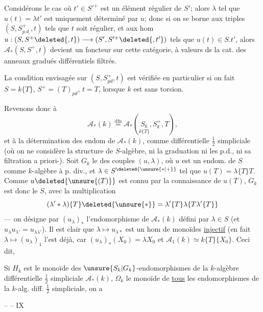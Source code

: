 Considérons le cas où $t'\in S'^+$ est un élément régulier de $S'$; alors $\lambda$ tel que $u(t)=\lambda t'$ est uniquement déterminé par $u$; donc si on se borne aux triples $(S,S^+_{p.d.},t)$ tels que $t$ soit régulier, et aux hom $u:(S,S^+\deleted{,t})\longrightarrow(S',S'^+\deleted{,t'})$ tels que $u(t)\in S.t'$, alors $\mathcal A_*(S,S^+,t)$ devient un foncteur sur cette catégorie, à valeurs ds la cat. des  anneaux gradués   différentiels filtrés.

La condition envisagée sur $(S,S^+_{pd},t)$ est vérifiée en particulier si on fait $S=k\{T\}$, $S^+=(T)_{pd}$, $t=T$, lorsque $k$ est sans torsion.

Revenons donc à
\[
\mathcal A_*(k)\overset{\mathrm{dfn}}=\mathcal A_*(\underset{k\{T\}}{S_k},S_k^+,T),
\]
et à la détermination des endom de $\mathcal A_*(k)$, comme   différentielle $\frac12$ simpliciale (où on ne considère  la structure de $S$-algèbre, ni la graduation ni les p.d., ni sa filtration a priori-). 
Soit $G_k$ le   des couples $(u,\lambda)$, où $u$ est un endom. de $S$ comme $k$-algèbre à p. div., et $\lambda\in S^{\deleted{\unsure{*|+}}}$ tel que $u(T)=\lambda\{T\}T$. Comme $u\deleted{\unsure{(T)}}$ est connu par la connaissance de $u(T)$, $G_k$ est donc le    $S$, avec la multiplication
\[
(\lambda'*\lambda)\{T\}\deleted{\unsure{*}}=\lambda'\{T\}\lambda\{T\lambda'\{T\}\}
\]
 --- on désigne par $(u_\lambda)_*$ l'endomorphisme de $\mathcal A_*(k)$ défini par $\lambda\in S$ (et $u_\lambda u_{\lambda'}=u_{\lambda\lambda'}$).
Il est clair que $\lambda\longmapsto u_{\lambda*}$ est un hom de monoïdes \uline{injectif} (en fait $\lambda\longmapsto(u_\lambda)_1$ l'est déjà, car $(u_\lambda)_*(X_0)=\lambda X_0$ et $\mathcal A_1(k)\simeq k\{T\}\{X_0\}$.
Ceci dit,

Si $H_k$ est le monoïde des $\unsure{S_k|G_k}$-endomorphismes de la $k$-algèbre différentielle $\frac12$ simpliciale $\mathcal A_*(k)$,   $\Omega_k$ le monoïde de \uline{tous} les endomorphismes de la $k$-alg. diff. $\frac12$ simpliciale, on a

\hfill --  -- \hfill IX

